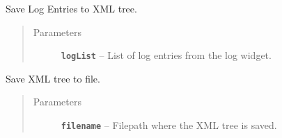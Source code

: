 \documentclass[a4paper,10pt,english]{sphinxmanual}
\begin{document}
\begin{fulllineitems}
\begin{fulllineitems}
\begin{quote}
\begin{description}
\begin{itemize}
\end{itemize}

\end{description}\end{quote}

\end{fulllineitems}


\begin{fulllineitems}
\label{inout_link:inout.XMLIO.XMLIO.saveLog}
Save Log Entries to XML tree.
\begin{quote}\begin{description}
\item[{Parameters}] \leavevmode
\textbf{\texttt{logList}} -- List of log entries from the log widget.

\end{description}\end{quote}

\end{fulllineitems}


\begin{fulllineitems}
\label{inout_link:inout.XMLIO.XMLIO.saveNet}
Save XML tree to file.
\begin{quote}\begin{description}
\item[{Parameters}] \leavevmode
\textbf{\texttt{filename}} -- Filepath where the XML tree is saved.

\end{description}\end{quote}

\end{fulllineitems}


\end{fulllineitems}


\begin{fulllineitems}
\label{inout_link:inout.XMLIO.bin_}
\end{fulllineitems}

\end{document}
